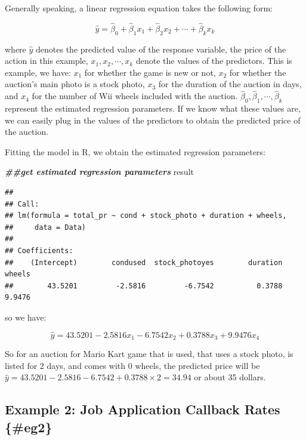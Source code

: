 \documentclass[
]{book}
\newenvironment{Shaded}{\begin{snugshade}}{\end{snugshade}}
\newcommand{\DocumentationTok}[1]{\textcolor[rgb]{0.56,0.35,0.01}{\textbf{\textit{#1}}}}
\newcommand{\NormalTok}[1]{#1}
\begin{document}
Generally speaking, a linear regression equation takes the following form:

\[
\hat{y} = \hat{\beta}_0 + \hat{\beta}_1 x_1 + \hat{\beta}_2 x_2 + \cdots + \hat{\beta}_k x_k
\]

where \(\hat{y}\) denotes the predicted value of the response variable, the price of the action in this example, \(x_1, x_2, \cdots, x_k\) denote the values of the predictors. This is example, we have: \(x_1\) for whether the game is new or not, \(x_2\) for whether the auction's main photo is a stock photo, \(x_3\) for the duration of the auction in days, and \(x_4\) for the number of Wii wheels included with the auction. \(\hat{\beta}_0, \hat{\beta}_1, \cdots, \hat{\beta}_k\) represent the estimated regression parameters. If we know what these values are, we can easily plug in the values of the predictors to obtain the predicted price of the auction.

Fitting the model in R, we obtain the estimated regression parameters:

\begin{Shaded}
\begin{Highlighting}[]
\DocumentationTok{\#\#get estimated regression parameters}
\NormalTok{result}
\end{Highlighting}
\end{Shaded}

\begin{verbatim}
## 
## Call:
## lm(formula = total_pr ~ cond + stock_photo + duration + wheels, 
##     data = Data)
## 
## Coefficients:
##    (Intercept)        condused  stock_photoyes        duration          wheels  
##        43.5201         -2.5816         -6.7542          0.3788          9.9476
\end{verbatim}

so we have:

\[
\hat{y} = 43.5201 - 2.5816 x_1 - 6.7542 x_2 + 0.3788 x_3 + 9.9476 x_4
\]

So for an auction for Mario Kart game that is used, that uses a stock photo, is listed for 2 days, and comes with 0 wheels, the predicted price will be \(\hat{y} = 43.5201 - 2.5816 - 6.7542 + 0.3788 \times 2 = 34.94\) or about 35 dollars.

\hypertarget{example-2-job-application-callback-rates-eg2}{%
\subsection*{Example 2: Job Application Callback Rates \{\#eg2\}}\label{example-2-job-application-callback-rates-eg2}}
\end{document}
